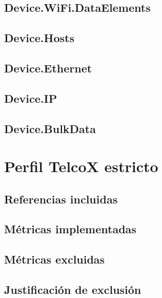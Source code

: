 \subsection{Device.WiFi.DataElements}
\label{subsec:device-wifi-dataelements-modelo}

\subsection{Device.Hosts}
\label{subsec:device-hosts}

\subsection{Device.Ethernet}
\label{subsec:device-ethernet}

\subsection{Device.IP}
\label{subsec:device-ip}

\subsection{Device.BulkData}
\label{subsec:device-bulkdata-modelo}


\section{Perfil TelcoX estricto}
\label{sec:perfil-telcox-estricto}

\subsection{Referencias incluidas}
\label{subsec:referencias-incluidas}

\subsection{Métricas implementadas}
\label{subsec:metricas-implementadas}

\subsection{Métricas excluidas}
\label{subsec:metricas-excluidas}

\subsection{Justificación de exclusión}
\label{subsec:justificacion-exclusion}


